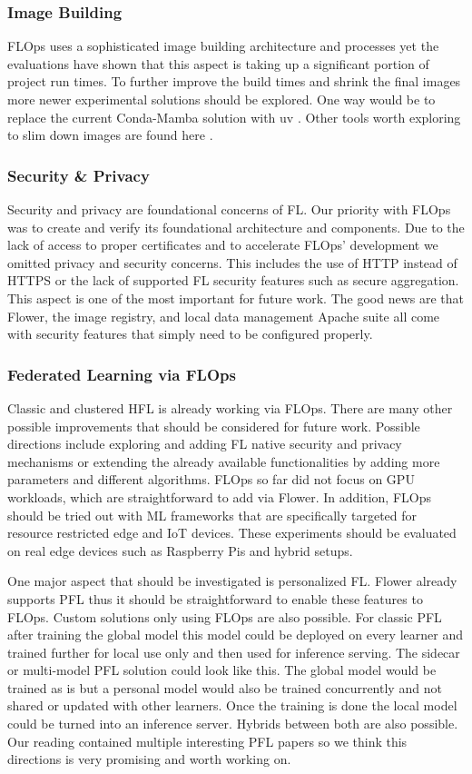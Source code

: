 \subsubsection{Image Building}
FLOps uses a sophisticated image building architecture and processes yet the evaluations have shown that this aspect is taking up a significant portion of project run times.
To further improve the build times and shrink the final images more newer experimental solutions should be explored.
One way would be to replace the current Conda-Mamba solution with uv \cite{uv}.
Other tools worth exploring to slim down images are found here \cite{slim,dragonfly,nydus}.

\subsubsection{Security \& Privacy}
Security and privacy are foundational concerns of FL.
Our priority with FLOps was to create and verify its foundational architecture and components.
Due to the lack of access to proper certificates and to accelerate FLOps' development we omitted privacy and security concerns.
This includes the use of HTTP instead of HTTPS or the lack of supported FL security features such as secure aggregation.
This aspect is one of the most important for future work.
The good news are that Flower, the image registry, and local data management Apache suite all come with security features that simply need to be configured properly.

\subsubsection{Federated Learning via FLOps}
Classic and clustered HFL is already working via FLOps.
There are many other possible improvements that should be considered for future work.
Possible directions include exploring and adding FL native security and privacy mechanisms or extending the already available functionalities by adding more parameters and different algorithms.
FLOps so far did not focus on GPU workloads, which are straightforward to add via Flower.
In addition, FLOps should be tried out with ML frameworks that are specifically targeted for resource restricted edge and IoT devices.
These experiments should be evaluated on real edge devices such as Raspberry Pis and hybrid setups.

One major aspect that should be investigated is personalized FL.
Flower already supports PFL thus it should be straightforward to enable these features to FLOps.
Custom solutions only using FLOps are also possible.
For classic PFL after training the global model this model could be deployed on every learner and trained further for local use only and then used for inference serving.
The sidecar or multi-model PFL solution could look like this.
The global model would be trained as is but a personal model would also be trained concurrently and not shared or updated with other learners.
Once the training is done the local model could be turned into an inference server.
Hybrids between both are also possible.
Our reading contained multiple interesting PFL papers so we think this directions is very promising and worth working on.

